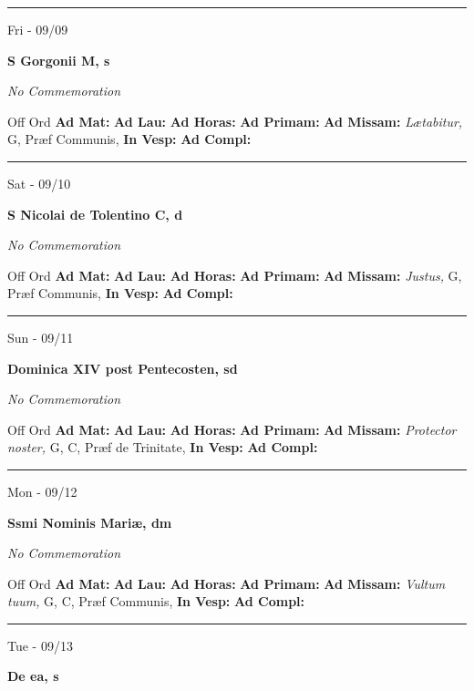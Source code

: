 \documentclass[letterpaper, 10pt]{article}
\begin{document}
\hrule
\begin{center}
Fri - 09/09
\end{center}\textbf{ \large S Gorgonii M, \textnormal{\normalsize s}}

\textit{No Commemoration}\begin{justify}
Off Ord
\textbf{Ad Mat: }
\textbf{Ad Lau: }
\textbf{Ad Horas: }
\textbf{Ad Primam: }
\textbf{Ad Missam:} \textit{Lætabitur, } G, Præf Communis, 
\textbf{In Vesp: }
\textbf{Ad Compl: }\end{justify}



\hrule
\begin{center}
Sat - 09/10
\end{center}\textbf{ \large S Nicolai de Tolentino C, \textnormal{\normalsize d}}

\textit{No Commemoration}\begin{justify}
Off Ord
\textbf{Ad Mat: }
\textbf{Ad Lau: }
\textbf{Ad Horas: }
\textbf{Ad Primam: }
\textbf{Ad Missam:} \textit{Justus, } G, Præf Communis, 
\textbf{In Vesp: }
\textbf{Ad Compl: }\end{justify}



\hrule
\begin{center}
Sun - 09/11
\end{center}\textbf{ \large Dominica XIV post Pentecosten, \textnormal{\normalsize sd}}

\textit{No Commemoration}\begin{justify}
Off Ord
\textbf{Ad Mat: }
\textbf{Ad Lau: }
\textbf{Ad Horas: }
\textbf{Ad Primam: }
\textbf{Ad Missam:} \textit{Protector noster, } G, C, Præf de Trinitate, 
\textbf{In Vesp: }
\textbf{Ad Compl: }\end{justify}



\hrule
\begin{center}
Mon - 09/12
\end{center}\textbf{ \large Ssmi Nominis Mariæ, \textnormal{\normalsize dm}}

\textit{No Commemoration}\begin{justify}
Off Ord
\textbf{Ad Mat: }
\textbf{Ad Lau: }
\textbf{Ad Horas: }
\textbf{Ad Primam: }
\textbf{Ad Missam:} \textit{Vultum tuum, } G, C, Præf Communis, 
\textbf{In Vesp: }
\textbf{Ad Compl: }\end{justify}



\hrule
\begin{center}
Tue - 09/13
\end{center}\textbf{ \large De ea, \textnormal{\normalsize s}}
\end{document}
